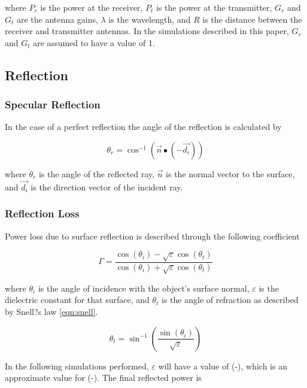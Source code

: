 where $P_r $ is the power at the receiver, $P_t$ is the power at the transmitter, $G_r$ and $G_t$ are the antenna gains, 
$\lambda$ is the wavelength, and $R$ is the distance between the receiver and transmitter antennas. In the simulations described in this paper, $G_r$ and $G_t$ are assumed to have a value of 1.

\subsection{Reflection}

\subsubsection{Specular Reflection}
In the case of a perfect reflection the angle of the reflection is calculated by

\begin{equation}
	\theta_r = \cos^{-1}(\vec{n} \bullet (-\vec{d_i}))
	\label{eqn:spec}
\end{equation}

where $\theta_r$ is the angle of the reflected ray, $\vec{n}$ is the normal vector to the surface, and $\vec{d_i}$ is the direction vector of the incident ray.

\subsubsection{Reflection Loss}
Power loss due to surface reflection is described through the following coefficient

\begin{equation}
	\Gamma = \frac{\cos(\theta_i) - \sqrt{\varepsilon}\cos(\theta_t)}{\cos(\theta_i) + \sqrt{\varepsilon}\cos(\theta_t)}
	\label{eqn:RL}
\end{equation}

where $\theta_i$ is the angle of incidence with the object's surface normal, $\varepsilon$ is the dielectric constant for that surface, and $\theta_t$ is the angle of refraction as described by Snell?s law \ref{eqn:snell}.

\begin{equation}
	\theta_t = \sin^{-1}\left(\frac{\sin(\theta_i)}{\sqrt{\varepsilon}} \right)
	\label{eqn:snell}
\end{equation}

In the following simulations performed, $\varepsilon$ will have a value of (-), which is an approximate value for (-). The final reflected power is

